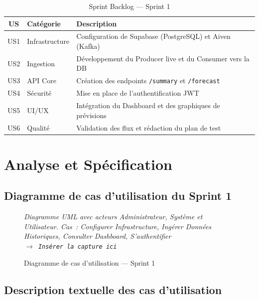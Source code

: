 \documentclass[a4paper,12pt,oneside]{report}
\newcommand{\imgplaceholder}[2]{%
  \begin{tcolorbox}[colback=blue!5,colframe=blue!40,title=#1]
    \centering\itshape #2\\[6pt]
    \texttt{$\rightarrow$ Insérer la capture ici}
  \end{tcolorbox}
}
\begin{document}
\begin{table}[H]
\centering
\caption{Sprint Backlog — Sprint 1}
\label{tab:sprint1_backlog}
\begin{tabularx}{\textwidth}{clX}
\toprule
\textbf{US} & \textbf{Catégorie} & \textbf{Description} \\
\midrule
US1 & Infrastructure & Configuration de Supabase (PostgreSQL) et Aiven (Kafka) \\
US2 & Ingestion      & Développement du Producer live et du Consumer vers la DB \\
US3 & API Core       & Création des endpoints \texttt{/summary} et \texttt{/forecast} \\
US4 & Sécurité       & Mise en place de l'authentification JWT \\
US5 & UI/UX          & Intégration du Dashboard et des graphiques de prévisions \\
US6 & Qualité        & Validation des flux et rédaction du plan de test \\
\bottomrule
\end{tabularx}
\end{table}

\section{Analyse et Spécification}

\subsection{Diagramme de cas d'utilisation du Sprint 1}

\begin{figure}[H]
\centering
\imgplaceholder{Figure~\ref{fig:uc_sprint1} — Cas d'utilisation Sprint 1}{Diagramme UML avec acteurs Administrateur, Système et Utilisateur. Cas~: Configurer Infrastructure, Ingérer Données Historiques, Consulter Dashboard, S'authentifier}
\caption{Diagramme de cas d'utilisation — Sprint 1}
\label{fig:uc_sprint1}
\end{figure}

\subsection{Description textuelle des cas d'utilisation}
\end{document}

